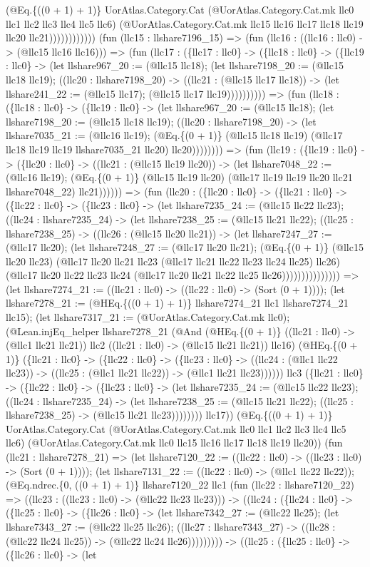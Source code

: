 \documentclass[11pt]{article}
\begin{document}
(@Eq.\{((0 + 1) + 1)\} UorAtlas.Category.Cat (@UorAtlas.Category.Cat.mk llc0 llc1 llc2 llc3 llc4 llc5 llc6) (@UorAtlas.Category.Cat.mk llc15 llc16 llc17 llc18 llc19 llc20 llc21)))))))))))) (fun (llc15 : llshare7196\_15) => (fun (llc16 : ((llc16 : llc0) -> (@llc15 llc16 llc16))) => (fun (llc17 : (\{llc17 : llc0\} -> (\{llc18 : llc0\} -> (\{llc19 : llc0\} -> (let llshare967\_20 := (@llc15 llc18); (let llshare7198\_20 := (@llc15 llc18 llc19); ((llc20 : llshare7198\_20) -> ((llc21 : (@llc15 llc17 llc18)) -> (let llshare241\_22 := (@llc15 llc17); (@llc15 llc17 llc19)))))))))) => (fun (llc18 : (\{llc18 : llc0\} -> (\{llc19 : llc0\} -> (let llshare967\_20 := (@llc15 llc18); (let llshare7198\_20 := (@llc15 llc18 llc19); ((llc20 : llshare7198\_20) -> (let llshare7035\_21 := (@llc16 llc19); (@Eq.\{(0 + 1)\} (@llc15 llc18 llc19) (@llc17 llc18 llc19 llc19 llshare7035\_21 llc20) llc20)))))))) => (fun (llc19 : (\{llc19 : llc0\} -> (\{llc20 : llc0\} -> ((llc21 : (@llc15 llc19 llc20)) -> (let llshare7048\_22 := (@llc16 llc19); (@Eq.\{(0 + 1)\} (@llc15 llc19 llc20) (@llc17 llc19 llc19 llc20 llc21 llshare7048\_22) llc21)))))) => (fun (llc20 : (\{llc20 : llc0\} -> (\{llc21 : llc0\} -> (\{llc22 : llc0\} -> (\{llc23 : llc0\} -> (let llshare7235\_24 := (@llc15 llc22 llc23); ((llc24 : llshare7235\_24) -> (let llshare7238\_25 := (@llc15 llc21 llc22); ((llc25 : llshare7238\_25) -> ((llc26 : (@llc15 llc20 llc21)) -> (let llshare7247\_27 := (@llc17 llc20); (let llshare7248\_27 := (@llc17 llc20 llc21); (@Eq.\{(0 + 1)\} (@llc15 llc20 llc23) (@llc17 llc20 llc21 llc23 (@llc17 llc21 llc22 llc23 llc24 llc25) llc26) (@llc17 llc20 llc22 llc23 llc24 (@llc17 llc20 llc21 llc22 llc25 llc26))))))))))))))) => (let llshare7274\_21 := ((llc21 : llc0) -> ((llc22 : llc0) -> (Sort (0 + 1)))); (let llshare7278\_21 := (@HEq.\{((0 + 1) + 1)\} llshare7274\_21 llc1 llshare7274\_21 llc15); (let llshare7317\_21 := (@UorAtlas.Category.Cat.mk llc0); (@Lean.injEq\_helper llshare7278\_21 (@And (@HEq.\{(0 + 1)\} ((llc21 : llc0) -> (@llc1 llc21 llc21)) llc2 ((llc21 : llc0) -> (@llc15 llc21 llc21)) llc16) (@HEq.\{(0 + 1)\} (\{llc21 : llc0\} -> (\{llc22 : llc0\} -> (\{llc23 : llc0\} -> ((llc24 : (@llc1 llc22 llc23)) -> ((llc25 : (@llc1 llc21 llc22)) -> (@llc1 llc21 llc23)))))) llc3 (\{llc21 : llc0\} -> (\{llc22 : llc0\} -> (\{llc23 : llc0\} -> (let llshare7235\_24 := (@llc15 llc22 llc23); ((llc24 : llshare7235\_24) -> (let llshare7238\_25 := (@llc15 llc21 llc22); ((llc25 : llshare7238\_25) -> (@llc15 llc21 llc23)))))))) llc17)) (@Eq.\{((0 + 1) + 1)\} UorAtlas.Category.Cat (@UorAtlas.Category.Cat.mk llc0 llc1 llc2 llc3 llc4 llc5 llc6) (@UorAtlas.Category.Cat.mk llc0 llc15 llc16 llc17 llc18 llc19 llc20)) (fun (llc21 : llshare7278\_21) => (let llshare7120\_22 := ((llc22 : llc0) -> ((llc23 : llc0) -> (Sort (0 + 1)))); (let llshare7131\_22 := ((llc22 : llc0) -> (@llc1 llc22 llc22)); (@Eq.ndrec.\{0, ((0 + 1) + 1)\} llshare7120\_22 llc1 (fun (llc22 : llshare7120\_22) => ((llc23 : ((llc23 : llc0) -> (@llc22 llc23 llc23))) -> ((llc24 : (\{llc24 : llc0\} -> (\{llc25 : llc0\} -> (\{llc26 : llc0\} -> (let llshare7342\_27 := (@llc22 llc25); (let llshare7343\_27 := (@llc22 llc25 llc26); ((llc27 : llshare7343\_27) -> ((llc28 : (@llc22 llc24 llc25)) -> (@llc22 llc24 llc26))))))))) -> ((llc25 : (\{llc25 : llc0\} -> (\{llc26 : llc0\} -> (let 
\end{document}
